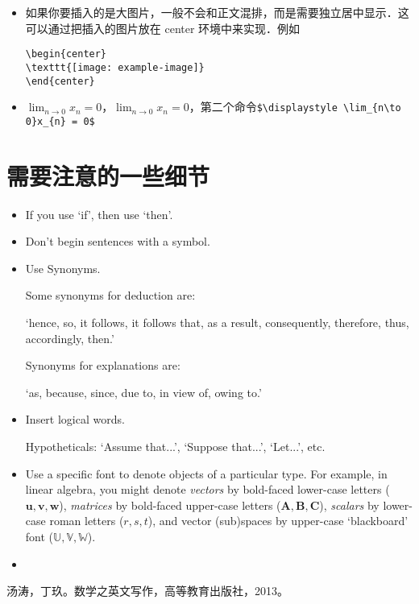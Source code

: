 \documentclass[11pt,final]{article}
\numberwithin{equation}{section}
\begin{document}
\begin{itemize}
\verb|\renewcommand\arraystretch{1.5}|
\item 如果你要插入的是大图片，一般不会和正文混排，而是需要独立居中显示．这可以通过把插入的图片放在 center 环境中来实现．例如
\begin{verbatim}
\begin{center}
\texttt{[image: example-image]}
\end{center}
\end{verbatim}
\item $ \lim _ {n\to 0}x_n = 0 $，$\displaystyle \lim _ {n\to 0}x _ n = 0$，第二个命令\verb|$\displaystyle \lim_{n\to 0}x_{n} = 0$|
\end{itemize}		
		
\section{需要注意的一些细节}	
\begin{itemize}
	\item If you use `if', then use `then'.	
	\item Don't begin sentences with a symbol.
	\item Use Synonyms.
	
	Some synonyms for deduction are:
	
	`hence, so, it follows, it follows that, as a result, consequently, therefore, thus,
	accordingly, then.'
	
	Synonyms for explanations are:
	
	`as, because, since, due to, in view of, owing to.'
	\item Insert logical words.
	
	Hypotheticals: `Assume that...', `Suppose that...', `Let...', etc.
	\item  Use a specific font to denote objects of a particular type. For example, in linear algebra, you might denote \textit{vectors} by bold-faced lower-case letters ($\mathbf{u,v,w}$), \textit{matrices} by bold-faced upper-case letters ($ \mathbf{A,B,C} $), \textit{scalars} by lower-case roman letters ($ r,s,t $),  and vector (sub)spaces by upper-case `blackboard' font ($ \mathbb{U,V,W} $).
	\item 
\end{itemize}

		
\begin{thebibliography}{100}
汤涛，丁玖。数学之英文写作，高等教育出版社，2013。	
\end{thebibliography}
\end{document}
